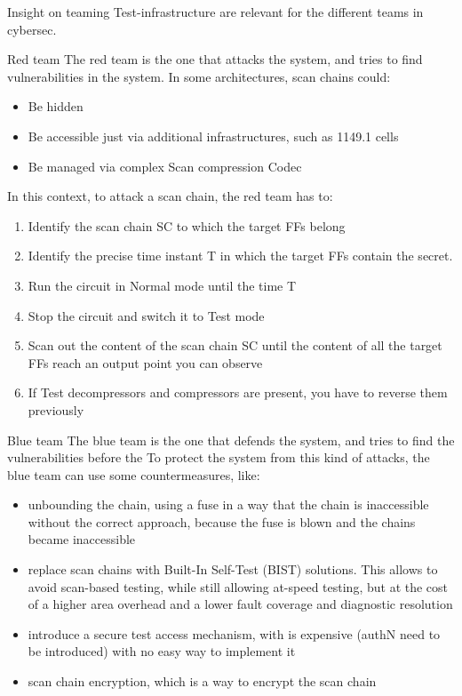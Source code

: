 \begin{section}{Insight on teaming}
  Test-infrastructure are relevant for the different teams in cybersec.
  \begin{subsection}{Red team}
    The red team is the one that attacks the system, and tries to find vulnerabilities in the system.
    In some architectures, scan chains could:
    \begin{itemize}
      \item Be hidden
      \item Be accessible just via additional infrastructures, such as 1149.1 cells
      \item Be managed via complex Scan compression Codec
    \end{itemize}
    In this context, to attack a scan chain, the red team has to:
    \begin{enumerate}
      \item Identify the scan chain SC to which the target FFs belong
      \item Identify the precise time instant T in which the target FFs contain the secret.
      \item Run the circuit in Normal mode until the time T
      \item Stop the circuit and switch it to Test mode
      \item Scan out the content of the scan chain SC until the content of all the target FFs reach an output
        point you can observe
      \item If Test decompressors and compressors are present, you have to reverse them previously
    \end{enumerate}

  \end{subsection}

  \begin{subsection}{Blue team}
    The blue team is the one that defends the system, and tries to find the vulnerabilities before the
    To protect the system from this kind of attacks, the blue team can use some countermeasures,
    like:
    \begin{itemize}
      \item unbounding the chain, using a fuse in a way that the chain is inaccessible without the
        correct approach, because the fuse is blown and the chains became inaccessible
      \item replace scan chains with Built-In Self-Test (BIST) solutions. This allows to avoid
        scan-based testing, while still allowing at-speed testing, but at the cost of a higher area 
        overhead and a lower fault coverage and diagnostic resolution
      \item introduce a secure test access mechanism, with is expensive (authN need to be
        introduced) with no easy way to implement it
      \item scan chain encryption, which is a way to encrypt the scan chain
    \end{itemize}

  \end{subsection}
\end{section}
